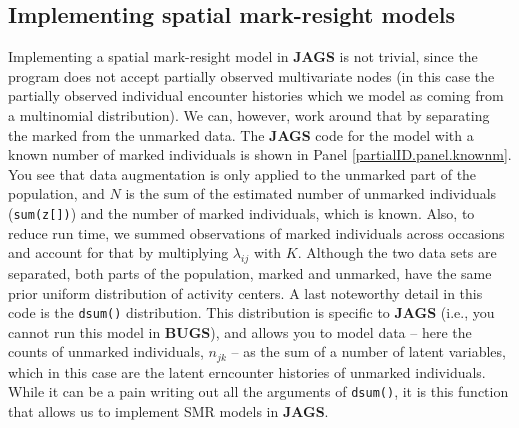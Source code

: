 \subsection{Implementing spatial mark-resight models}
Implementing a spatial mark-resight model in {\bf JAGS} is not
trivial, since the program does not accept partially observed
multivariate nodes (in this case the partially observed individual
encounter histories which we model as coming from a multinomial
distribution). %
We can, however, work around that by separating the marked from the unmarked data. The {\bf JAGS} code for the model with a known number of marked individuals is shown in Panel \ref{partialID.panel.knownm}. You see that data augmentation is only applied to the unmarked part of the population, and $N$ is the sum of the estimated number of unmarked individuals ({\tt sum(z[])}) and the number of marked individuals, which is known. Also, to reduce run time, we summed observations of marked individuals across occasions and account for that by multiplying $\lambda_{ij}$ with $K$. Although the two data sets are separated, both parts of the population, marked and unmarked, have the same prior uniform distribution of activity centers.
A last noteworthy detail in this code is the {\tt dsum()}
distribution. %
This distribution %
is specific to {\bf JAGS} (i.e., you cannot run this model in {\bf
  BUGS}), and allows you to model data -- here the counts of unmarked
individuals, $n_{jk}$ -- as the sum of a number of latent variables,
which in this case are
the latent erncounter histories of unmarked individuals. While it can be a pain writing out all the arguments of {\tt dsum()}, it is this function that allows us to implement SMR models in {\bf JAGS}.


